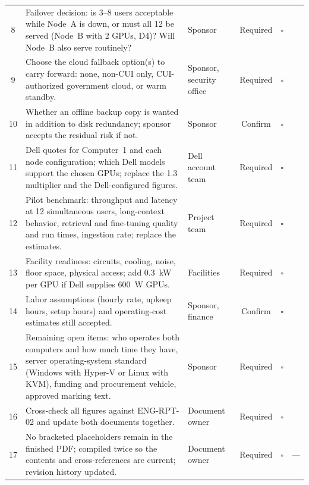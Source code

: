 {\begin{xltabular}{\textwidth}{@{}c Y{1.5} Y{0.7} c c Y{0.8}@{}}
  8 & Failover decision: is 3--8 users acceptable while Node~A is down, or must all 12 be served (Node~B with 2 GPUs, D4)? Will Node~B also serve routinely? & Sponsor & Required & $\square$ &  \\
  9 & Choose the cloud fallback option(s) to carry forward: none, non-CUI only, CUI-authorized government cloud, or warm standby. & Sponsor, security office & Required & $\square$ &  \\
  10 & Whether an offline backup copy is wanted in addition to disk redundancy; sponsor accepts the residual risk if not. & Sponsor & Confirm & $\square$ &  \\
  11 & Dell quotes for Computer~1 and each node configuration; which Dell models support the chosen GPUs; replace the 1.3 multiplier and the Dell-configured figures. & Dell account team & Required & $\square$ &  \\
  12 & Pilot benchmark: throughput and latency at 12 simultaneous users, long-context behavior, retrieval and fine-tuning quality and run times, ingestion rate; replace the estimates. & Project team & Required & $\square$ &  \\
  13 & Facility readiness: circuits, cooling, noise, floor space, physical access; add 0.3~kW per GPU if Dell supplies 600~W GPUs. & Facilities & Required & $\square$ &  \\
  14 & Labor assumptions (hourly rate, upkeep hours, setup hours) and operating-cost estimates still accepted. & Sponsor, finance & Confirm & $\square$ &  \\
  15 & Remaining open items: who operates both computers and how much time they have, server operating-system standard (Windows with Hyper-V or Linux with KVM), funding and procurement vehicle, approved marking text. & Sponsor & Required & $\square$ &  \\
  16 & Cross-check all figures against ENG-RPT-02 and update both documents together. & Document owner & Required & $\square$ &  \\
  17 & No bracketed placeholders remain in the finished PDF; compiled twice so the contents and cross-references are current; revision history updated. & Document owner & Required & $\square$ & --- \\
  \bottomrule
\end{xltabular}}
